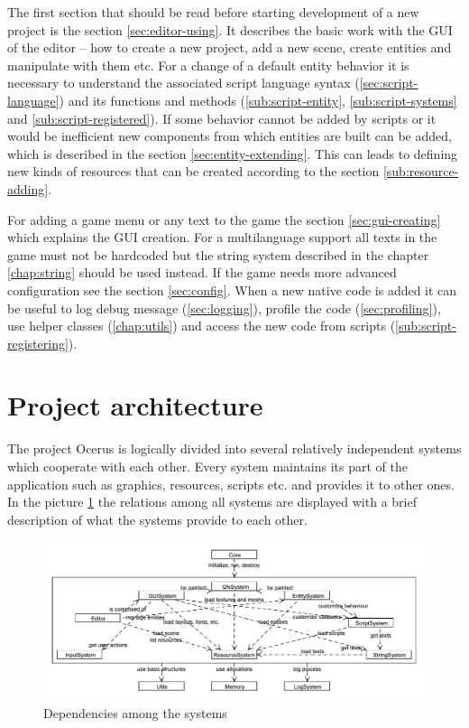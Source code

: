 \documentclass[a4paper, 12pt]{report}
\begin{document}
The first section that should be read before starting development of a new project is the section \ref{sec:editor-using}. It describes the basic work with the GUI of the editor -- how to create a new project, add a new scene, create entities and manipulate with them etc. For a change of a default entity behavior it is necessary to understand the associated script language syntax (\ref{sec:script-language}) and its functions and methods (\ref{sub:script-entity}, \ref{sub:script-systems} and \ref{sub:script-registered}). If some behavior cannot be added by scripts or it would be inefficient new components from which entities are built can be added, which is described in the section \ref{sec:entity-extending}. This can leads to defining new kinds of resources that can be created according to the section \ref{sub:resource-adding}.

For adding a game menu or any text to the game the section \ref{sec:gui-creating} which explains the GUI creation. For a multilanguage support all texts in the game must not be hardcoded but the string system described in the chapter \ref{chap:string} should be used instead. If the game needs more advanced configuration see the section \ref{sec:config}. When a new native code is added it can be useful to log debug message (\ref{sec:logging}), profile the code (\ref{sec:profiling}), use helper classes (\ref{chap:utils}) and access the new code from scripts (\ref{sub:script-registering}).

\section{Project architecture}

The project Ocerus is logically divided into several relatively independent systems which cooperate with each other. Every system maintains its part of the application such as graphics, resources, scripts etc. and provides it to other ones. In the picture \ref{fig:system-connection} the relations among all systems are displayed with a brief description of what the systems provide to each other.

\begin{figure}[htbp]
	\centering
		\includegraphics[width=1\textwidth]{SystemConnection.pdf}
	\caption{Dependencies among the systems}
	\label{fig:system-connection}
\end{figure}
\end{document}

